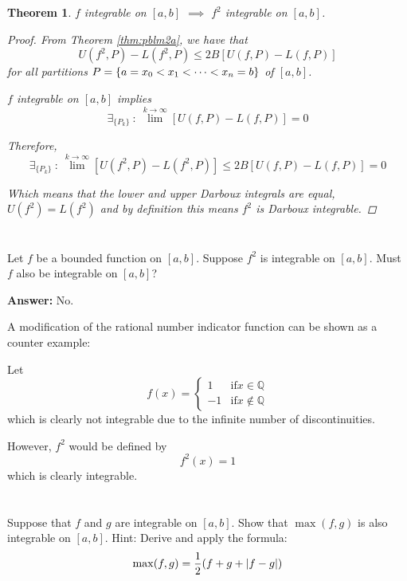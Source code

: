 \documentclass[]{article}
\newcommand{\Q}{\mathbb{Q}}
\newcommand{\st}{\ : \ }
\newtheorem{theorem}{Theorem}
\begin{document}
\begin{theorem}
    $f$ integrable on $[a,b]$ $\implies$ $f^2$ integrable on $[a,b]$.
    \begin{proof}
        From Theorem \ref{thm:pblm2a}, we have that \[
            U(f^2,P) - L(f^2,P) \leq 2 B [U(f,P) - L(f,P)]
        \] for all partitions $P=\qty{a=x_0<x_1<\dots<x_n=b}$ of $[a,b]$.

        $f$ integrable on $[a,b]$ implies\[
            \exists_{\{P_k\}} \st \lim^{k\to\infty} [U(f,P) - L(f,P)] = 0
        \]

        Therefore,\[
            \exists_{\{P_k\}} \st \lim^{k\to\infty} [U(f^2,P) - L(f^2,P)] \leq 2B [U(f,P) - L(f,P)] = 0
        \]

        Which means that the lower and upper Darboux integrals are equal, 
        $U(f^2) = L(f^2)$ and by definition this means $f^2$ is Darboux integrable.
    \end{proof}
\end{theorem}

\newpage
\section{}
Let $f$ be a bounded function on $[a,b]$.
Suppose $f^2$ is integrable on $[a,b]$.
Must $f$ also be integrable on $[a,b]$?

\textbf{Answer:} 
No.

A modification of the rational number indicator function can be shown as a counter example:

Let\[
    f(x) = \begin{cases}
        1 & \text{if} x \in \Q\\
        -1 & \text{if} x \notin \Q
    \end{cases}
\] which is clearly not integrable due to the infinite number of discontinuities.

However, $f^2$ would be defined by \[
    f^2(x) = 1
\] which is clearly integrable.

\newpage
\section{}
Suppose that $f$ and $g$ are integrable on $[a,b]$. 
Show that $\max(f,g)$ is also integrable on $[a,b]$.
Hint: Derive and apply the formula:\[
    \max(f,g) = \frac{1}{2} (f+g+\abs{f-g})
\]
\end{document}
